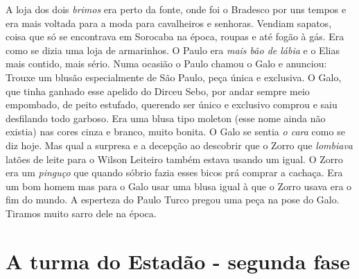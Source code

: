 \documentclass[12pt,brazil,]{book}
\begin{document}
A loja dos dois \emph{brimos} era perto da fonte, onde foi o Bradesco
por uns tempos e era mais voltada para a moda para cavalheiros e
senhoras. Vendiam sapatos, coisa que só se encontrava em Sorocaba na
época, roupas e até fogão à gás. Era como se dizia uma loja de
armarinhos. O Paulo era \emph{mais bão de lábia} e o Elias mais contido,
mais sério. Numa ocasião o Paulo chamou o Galo e anunciou: Trouxe um
blusão especialmente de São Paulo, peça única e exclusiva. O Galo, que
tinha ganhado esse apelido do Dirceu Sebo, por andar sempre meio
empombado, de peito estufado, querendo ser único e exclusivo comprou e
saiu desfilando todo garboso. Era uma blusa tipo moleton (esse nome
ainda não existia) nas cores cinza e branco, muito bonita. O Galo se
sentia \emph{o cara} como se diz hoje. Mas qual a surpresa e a decepção
ao descobrir que o Zorro que \emph{lombiava} latões de leite para o
Wilson Leiteiro também estava usando um igual. O Zorro era um
\emph{pinguço} que quando sóbrio fazia esses bicos prá comprar a
cachaça. Era um bom homem mas para o Galo usar uma blusa igual à que o
Zorro usava era o fim do mundo. A esperteza do Paulo Turco pregou uma
peça na pose do Galo. Tiramos muito sarro dele na época.

\section{A turma do Estadão - segunda
fase}\label{a-turma-do-estaduxe3o---segunda-fase}
\end{document}
